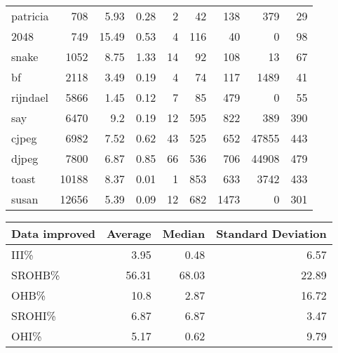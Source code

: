 \begin{tabular}{lrrrrrrrr}
 patricia       &            708 &     5.93 &   0.28 &    2 &     42 &          138 &   379 &    29 \\
 2048           &            749 &    15.49 &   0.53 &    4 &    116 &           40 &     0 &    98 \\
 snake          &           1052 &     8.75 &   1.33 &   14 &     92 &          108 &    13 &    67 \\
 bf             &           2118 &     3.49 &   0.19 &    4 &     74 &          117 &  1489 &    41 \\
 rijndael       &           5866 &     1.45 &   0.12 &    7 &     85 &          479 &     0 &    55 \\
 say            &           6470 &     9.2  &   0.19 &   12 &    595 &          822 &   389 &   390 \\
 cjpeg          &           6982 &     7.52 &   0.62 &   43 &    525 &          652 & 47855 &   443 \\
 djpeg          &           7800 &     6.87 &   0.85 &   66 &    536 &          706 & 44908 &   479 \\
 toast          &          10188 &     8.37 &   0.01 &    1 &    853 &          633 &  3742 &   433 \\
 susan          &          12656 &     5.39 &   0.09 &   12 &    682 &         1473 &     0 &   301 \\
\hline
\end{tabular}\begin{tabular}{lrrr}
\hline
 Data improved   &   Average &   Median &   Standard Deviation \\
\hline
 III\%            &      3.95 &     0.48 &                 6.57 \\
 SROHB\%          &     56.31 &    68.03 &                22.89 \\
 OHB\%            &     10.8  &     2.87 &                16.72 \\
 SROHI\%          &      6.87 &     6.87 &                 3.47 \\
 OHI\%            &      5.17 &     0.62 &                 9.79 \\
\hline
\end{tabular}